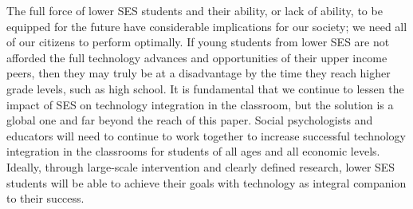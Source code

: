 The full force of lower SES students and their ability, or lack of ability, to be equipped for the future have considerable implications for our society; we need all of our citizens to perform optimally. If young students from lower SES are not afforded the full technology advances and opportunities of their upper income peers, then they may truly be at a disadvantage by the time they reach higher grade levels, such as high school. It is fundamental that we continue to lessen the impact of SES on technology integration in the classroom, but the solution is a global one and far beyond the reach of this paper. Social psychologists and educators will need to continue to work together to increase successful technology integration in the classrooms for students of all ages and all economic levels.  Ideally, through large-scale intervention and clearly defined research, lower SES students will be able to achieve their goals with technology as integral companion to their success. 
